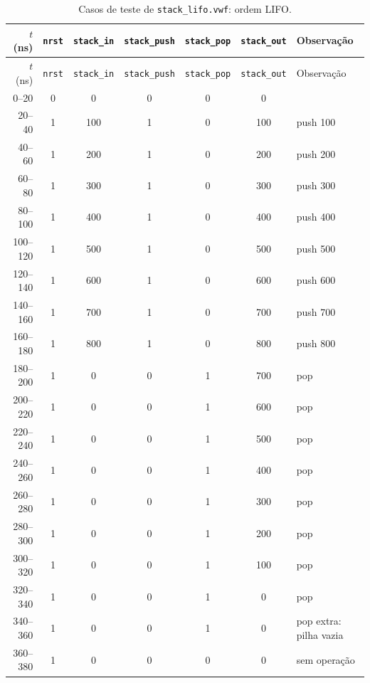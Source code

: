 {\scriptsize\setlength{\tabcolsep}{3pt}
\begin{longtable}{rcccccp{5.7cm}}
\caption{Casos de teste de \texttt{stack\_lifo.vwf}: ordem LIFO.}
\label{tab:caso-stack-lifo}\\
\hline $t$ (ns) & \texttt{nrst} & \texttt{stack\_in} & \texttt{stack\_push} & \texttt{stack\_pop} & \texttt{stack\_out} & Observação \\ \hline \endfirsthead
\hline $t$ (ns) & \texttt{nrst} & \texttt{stack\_in} & \texttt{stack\_push} & \texttt{stack\_pop} & \texttt{stack\_out} & Observação \\ \hline \endhead
0--20 & 0 & 0 & 0 & 0 & 0 &  \\
20--40 & 1 & 100 & 1 & 0 & 100 & push 100 \\
40--60 & 1 & 200 & 1 & 0 & 200 & push 200 \\
60--80 & 1 & 300 & 1 & 0 & 300 & push 300 \\
80--100 & 1 & 400 & 1 & 0 & 400 & push 400 \\
100--120 & 1 & 500 & 1 & 0 & 500 & push 500 \\
120--140 & 1 & 600 & 1 & 0 & 600 & push 600 \\
140--160 & 1 & 700 & 1 & 0 & 700 & push 700 \\
160--180 & 1 & 800 & 1 & 0 & 800 & push 800 \\
180--200 & 1 & 0 & 0 & 1 & 700 & pop \\
200--220 & 1 & 0 & 0 & 1 & 600 & pop \\
220--240 & 1 & 0 & 0 & 1 & 500 & pop \\
240--260 & 1 & 0 & 0 & 1 & 400 & pop \\
260--280 & 1 & 0 & 0 & 1 & 300 & pop \\
280--300 & 1 & 0 & 0 & 1 & 200 & pop \\
300--320 & 1 & 0 & 0 & 1 & 100 & pop \\
320--340 & 1 & 0 & 0 & 1 & 0 & pop \\
340--360 & 1 & 0 & 0 & 1 & 0 & pop extra: pilha vazia \\
360--380 & 1 & 0 & 0 & 0 & 0 & sem operação \\
\hline
\end{longtable}}
\vspace{-0.9cm}
